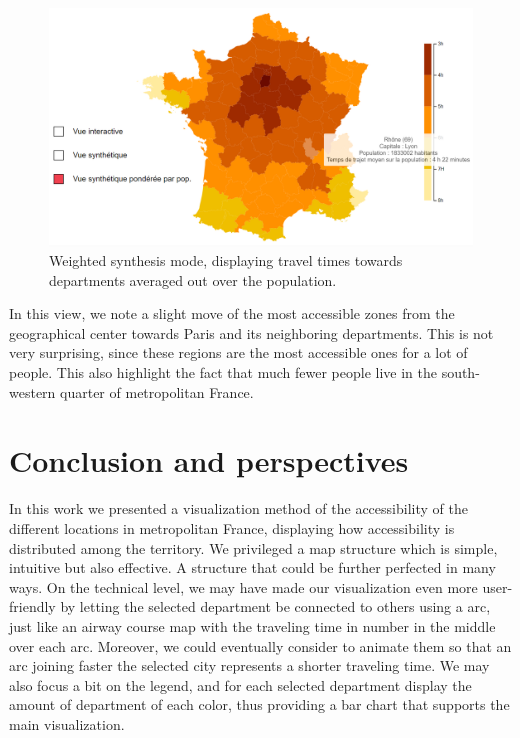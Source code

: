 \documentclass{vgtc}                          %
\begin{document}
\begin{figure}[h]
 \centering %
 \includegraphics[scale=1, width=\columnwidth]{ImageProjet10_01_Ter.png}
 \caption{Weighted synthesis mode, displaying travel times towards departments averaged out over the population.}
 \label{fig:sample}
\end{figure}


In this view, we note a slight move of the most accessible zones from the geographical center towards Paris and its neighboring departments. This is not very surprising, since these regions are the most accessible ones for a lot of people. This also highlight the fact that much fewer people live in the south-western quarter of metropolitan France. 



\section{Conclusion and perspectives}

\vspace{0.2cm}

In this work we presented a visualization method of the accessibility of the different locations in metropolitan France, displaying how accessibility is distributed among the territory. We privileged a map structure which is simple, intuitive but also effective. A structure that could be further perfected in many ways. On the technical level, we may have made our visualization even more user-friendly by letting the selected department be connected to others using a arc, just like an airway course map with the traveling time in number in the middle over each arc. Moreover, we could eventually consider to animate them so that an arc joining faster the selected city represents a shorter traveling time. We may also focus a bit on the legend, and for each selected department display the amount of department of each color, thus providing a bar chart that supports the main visualization. 
\end{document}
